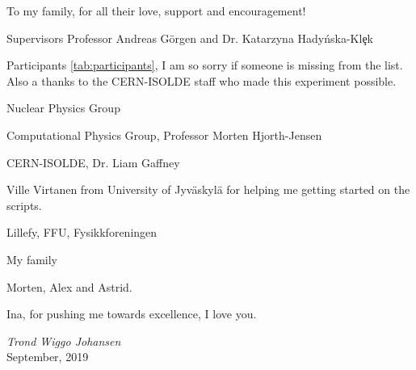 \documentclass[twoside,english]{uiofysmaster/uiofysmaster}
\let\orgautoref\autoref
\renewcommand{\autoref}
        {%
		 \def\sectionautorefname{Section}%
		 \def\subsectionautorefname{Section}%
		 \def\subsubsectionautorefname{Section}%
		 \def\chapterautorefname{Chapter}%
          \orgautoref}
\begin{document}
\begin{dedication}
To my family, for all their love, support and encouragement!

\end{dedication}

\begin{acknowledgements}
Supervisors Professor Andreas Görgen and Dr. Katarzyna Hady{\'{n}}ska-Kl{\c{e}}k



Participants \autoref{tab:participants}, I am so sorry if someone is missing from the list. 
Also a thanks to the CERN-ISOLDE staff who made this experiment possible.

Nuclear Physics Group

Computational Physics Group, Professor Morten Hjorth-Jensen

CERN-ISOLDE, Dr. Liam Gaffney

Ville Virtanen from University of Jyväskylä for helping me getting started on the scripts. 

Lillefy, FFU, Fysikkforeningen

My family

Morten, Alex and Astrid.

Ina, for pushing me towards excellence, I love you.





  \vspace{1.5cm}
  
  \noindent\textit{Trond Wiggo Johansen}\\
  
  \noindent September, 2019


\vspace{1cm}


\end{acknowledgements}
\end{document}
